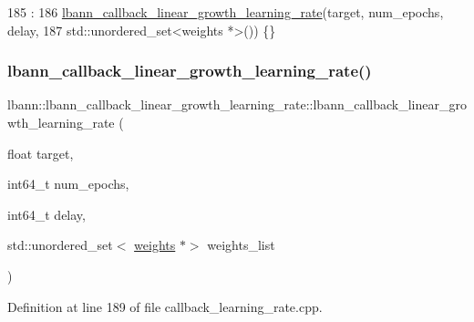 \begin{DoxyCode}
185                                                    :
186   \hyperlink{classlbann_1_1lbann__callback__linear__growth__learning__rate_a9eb24d8032af168a0eeec7e385909d55}{lbann\_callback\_linear\_growth\_learning\_rate}(target, num\_epochs, 
      delay,
187                                              std::unordered\_set<weights *>()) \{\}
\end{DoxyCode}
\mbox{\label{classlbann_1_1lbann__callback__linear__growth__learning__rate_a2382f7efb2bfe8b58fd68450b569a519}} 
\subsubsection{\texorpdfstring{lbann\+\_\+callback\+\_\+linear\+\_\+growth\+\_\+learning\+\_\+rate()}{lbann\_callback\_linear\_growth\_learning\_rate()}\hspace{0.1cm}{\footnotesize\ttfamily [3/4]}}
{\footnotesize\ttfamily lbann\+::lbann\+\_\+callback\+\_\+linear\+\_\+growth\+\_\+learning\+\_\+rate\+::lbann\+\_\+callback\+\_\+linear\+\_\+growth\+\_\+learning\+\_\+rate (\begin{DoxyParamCaption}\item[{float}]{target,  }\item[{int64\+\_\+t}]{num\+\_\+epochs,  }\item[{int64\+\_\+t}]{delay,  }\item[{std\+::unordered\+\_\+set$<$ \hyperlink{classlbann_1_1weights}{weights} $\ast$$>$}]{weights\+\_\+list }\end{DoxyParamCaption})}



Definition at line 189 of file callback\+\_\+learning\+\_\+rate.\+cpp.


